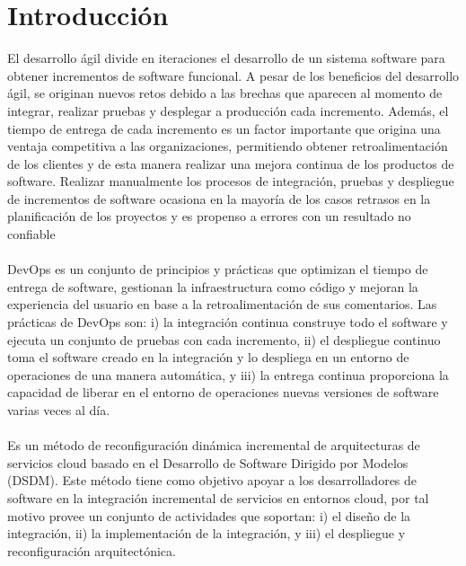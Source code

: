 \documentclass[preprint,12pt]{elsarticle}
\begin{document}
\section{Introducción}
El desarrollo ágil divide en iteraciones el desarrollo de un sistema software para
obtener incrementos de software funcional. A pesar de los beneficios del desarrollo
ágil, se originan nuevos retos debido a las brechas que aparecen al momento de integrar, realizar pruebas y desplegar a producción cada incremento. Además, el tiempo
de entrega de cada incremento es un factor importante que origina una ventaja competitiva a las organizaciones, permitiendo obtener retroalimentación de los clientes y de
esta manera realizar una mejora continua de los productos de software.
Realizar manualmente los procesos de integración, pruebas y despliegue de incrementos de software ocasiona en la mayoría de los casos retrasos en la planificación de
los proyectos y es propenso a errores con un resultado no confiable
\\
\\
DevOps es un
conjunto de principios y prácticas que optimizan el tiempo de entrega de software,
gestionan la infraestructura como código y mejoran la experiencia del usuario en base
a la retroalimentación de sus comentarios. Las prácticas de DevOps  son:
 i) la integración continua construye todo el software y ejecuta un conjunto de pruebas con
cada incremento, ii) el despliegue continuo toma el software creado en la integración
y lo despliega en un entorno de operaciones de una manera automática, y iii) la entrega continua proporciona la capacidad de liberar en el entorno de operaciones nuevas
versiones de software varias veces al día.
\\
\\
Es un método de reconfiguración dinámica incremental de arquitecturas
de servicios cloud basado en el Desarrollo de Software Dirigido por Modelos
(DSDM). Este método tiene como objetivo apoyar a los desarrolladores de software
en la integración incremental de servicios en entornos cloud, por tal motivo provee un
conjunto de actividades que soportan: i) el diseño de la integración, ii) la implementación de la integración, y iii) el despliegue y reconfiguración arquitectónica.

\end{document}
